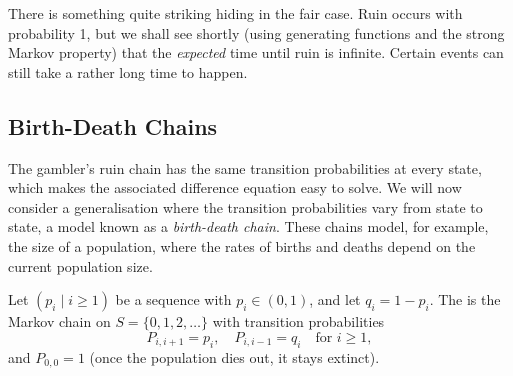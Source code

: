 \begin{remark}
	There is something quite striking hiding in the fair case. Ruin occurs with probability 1, but we shall see shortly (using generating functions and the strong Markov property) that the \emph{expected} time until ruin is infinite. Certain events can still take a rather long time to happen.
\end{remark}

\subsection{Birth-Death Chains}

The gambler's ruin chain has the same transition probabilities at every state, which makes the associated difference equation easy to solve. We will now consider a generalisation where the transition probabilities vary from state to state, a model known as a \emph{birth-death chain}. These chains model, for example, the size of a population, where the rates of births and deaths depend on the current population size.

Let $(p_i \mid i \geq 1)$ be a sequence with $p_i \in (0, 1)$, and let $q_i = 1 - p_i$. The  is the Markov chain on $S = \{0, 1, 2, \dots\}$ with transition probabilities
$$
P_{i, i + 1} = p_i, \quad P_{i, i - 1} = q_i \quad \text{for } i \geq 1,
$$
and $P_{0, 0} = 1$ (once the population dies out, it stays extinct).

\begin{center}
	\end{center}

